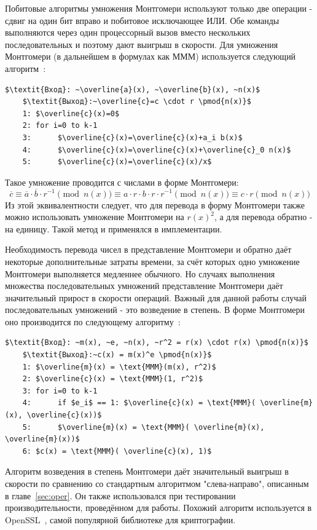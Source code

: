\documentclass[times,specification,annotation]{itmo-student-thesis}
\begin{document}
Побитовые алгоритмы умножения Монтгомери используют только две операции - сдвиг на один бит вправо и побитовое исключающее ИЛИ.
Обе команды выполняются через один процессорный вызов вместо нескольких последовательных и поэтому дают выигрыш в скорости.
Для умножения Монтгомери (в дальнейшем в формулах как МММ) используется следующий алгоритм~\cite{koc98}:
\begin{lstlisting}[mathescape=true]
    $\textit{Вход}: ~\overline{a}(x), ~\overline{b}(x), ~n(x)$
    $\textit{Выход}:~\overline{c}=c \cdot r \pmod{n(x)}$
    1: $\overline{c}(x)=0$
    2: for i=0 to k-1
    3:      $\overline{c}(x)=\overline{c}(x)+a_i b(x)$
    4:      $\overline{c}(x)=\overline{c}(x)+\overline{c}_0 n(x)$
    5:      $\overline{c}(x)=\overline{c}(x)/x$
\end{lstlisting}
Такое умножение проводится с числами в форме Монтгомери:
\[\overline{c} \equiv \overline{a} \cdot \overline{b} \cdot r^{-1} \pmod{n(x)}
\equiv a \cdot r \cdot b \cdot r \cdot r^{-1} \pmod{n(x)}
\equiv c \cdot r \pmod{n(x)}\]
Из этой эквивалентности следует, что для перевода в форму Монтгомери также можно использовать умножение Монтгомери на $r(x)^2$,
а для перевода обратно - на единицу.
Такой метод и применялся в имплементации.

Необходимость перевода чисел в представление Монтгомери и обратно даёт некоторые дополнительные затраты времени, за счёт которых одно умножение Монтгомери выполняется медленнее обычного.
Но случаях выполнения множества последовательных умножений представление Монтгомери даёт значительный прирост в скорости операций.
Важный для данной работы случай последовательных умножений - это возведение в степень.
В форме Монтгомери оно производится по следующему алгоритму~\cite{koc97}:
\begin{lstlisting}[mathescape=true]
    $\textit{Вход}: ~m(x), ~e, ~n(x), ~r^2 = r(x) \cdot r(x) \pmod{n(x)}$
    $\textit{Выход}:~c(x) = m(x)^e \pmod{n(x)}$
    1: $\overline{m}(x) = \text{MMM}(m(x), r^2)$
    2: $\overline{c}(x) = \text{MMM}(1, r^2)$
    3: for i=0 to k-1
    4:      if $e_i$ == 1: $\overline{c}(x) = \text{MMM}( \overline{m}(x), \overline{c}(x))$
    5:      $\overline{m}(x) = \text{MMM}( \overline{m}(x), \overline{m}(x))$
    6: $c(x) = \text{MMM}( \overline{c}(x), 1)$
\end{lstlisting}

Алгоритм возведения в степень Монтгомери даёт значительный выигрыш в скорости по сравнению со стандартным алгоритмом
"слева-направо", описанным в главе~\ref{sec:oper}.
Он также использовался при тестировании производительности, проведённом для работы.
Похожий алгоритм используется в OpenSSL~\cite{openssl}, самой популярной библиотеке для криптографии.
\end{document}
